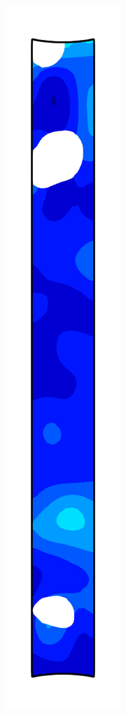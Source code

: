 \begin{figure}[!htb]
\begin{subfigure}{0.08\textwidth}
  \end{subfigure}
  \begin{subfigure}{0.08\textwidth}
    \centering
    \includegraphics[width=\textwidth]{Chapter5/figures/spallation/psie_4}

\end{subfigure}
\end{figure}
